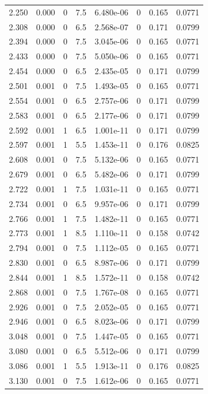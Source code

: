 \documentclass[preview]{standalone}
\begin{document}
{{{\begin{tabular}{L{1.2cm}C{1.2cm} C{0.3cm}C{0.5cm} C{1.4cm}C{1.4cm} C{1.4cm}C{1.4cm}}
  2.250  &  0.000  & 0     & 7.5 &  6.480e-06  & 0  & 0.165 &  0.0771   \\ 
  2.308  &  0.000  & 0     & 6.5 &  2.568e-07  & 0  & 0.171 &  0.0799   \\ 
  2.394  &  0.000  & 0     & 7.5 &  3.045e-06  & 0  & 0.165 &  0.0771   \\ 
  2.433  &  0.000  & 0     & 7.5 &  5.050e-06  & 0  & 0.165 &  0.0771   \\ 
  2.454  &  0.000  & 0     & 6.5 &  2.435e-05  & 0  & 0.171 &  0.0799   \\ 
  2.501  &  0.001  & 0     & 7.5 &  1.493e-05  & 0  & 0.165 &  0.0771   \\ 
  2.554  &  0.001  & 0     & 6.5 &  2.757e-06  & 0  & 0.171 &  0.0799   \\ 
  2.583  &  0.001  & 0     & 6.5 &  2.177e-06  & 0  & 0.171 &  0.0799   \\ 
  2.592  &  0.001  & 1     & 6.5 &  1.001e-11  & 0  & 0.171 &  0.0799   \\ 
  2.597  &  0.001  & 1     & 5.5 &  1.453e-11  & 0  & 0.176 &  0.0825   \\ 
  2.608  &  0.001  & 0     & 7.5 &  5.132e-06  & 0  & 0.165 &  0.0771   \\ 
  2.679  &  0.001  & 0     & 6.5 &  5.482e-06  & 0  & 0.171 &  0.0799   \\ 
  2.722  &  0.001  & 1     & 7.5 &  1.031e-11  & 0  & 0.165 &  0.0771   \\ 
  2.734  &  0.001  & 0     & 6.5 &  9.957e-06  & 0  & 0.171 &  0.0799   \\ 
  2.766  &  0.001  & 1     & 7.5 &  1.482e-11  & 0  & 0.165 &  0.0771   \\ 
  2.773  &  0.001  & 1     & 8.5 &  1.110e-11  & 0  & 0.158 &  0.0742   \\ 
  2.794  &  0.001  & 0     & 7.5 &  1.112e-05  & 0  & 0.165 &  0.0771   \\ 
  2.830  &  0.001  & 0     & 6.5 &  8.987e-06  & 0  & 0.171 &  0.0799   \\ 
  2.844  &  0.001  & 1     & 8.5 &  1.572e-11  & 0  & 0.158 &  0.0742   \\ 
  2.868  &  0.001  & 0     & 7.5 &  1.767e-08  & 0  & 0.165 &  0.0771   \\ 
  2.926  &  0.001  & 0     & 7.5 &  2.052e-05  & 0  & 0.165 &  0.0771   \\ 
  2.946  &  0.001  & 0     & 6.5 &  8.023e-06  & 0  & 0.171 &  0.0799   \\ 
  3.048  &  0.001  & 0     & 7.5 &  1.447e-05  & 0  & 0.165 &  0.0771   \\ 
  3.080  &  0.001  & 0     & 6.5 &  5.512e-06  & 0  & 0.171 &  0.0799   \\ 
  3.086  &  0.001  & 1     & 5.5 &  1.913e-11  & 0  & 0.176 &  0.0825   \\ 
  3.130  &  0.001  & 0     & 7.5 &  1.612e-06  & 0  & 0.165 &  0.0771   \\ 
\hline 
\end{tabular} 

}}}
\end{document}

